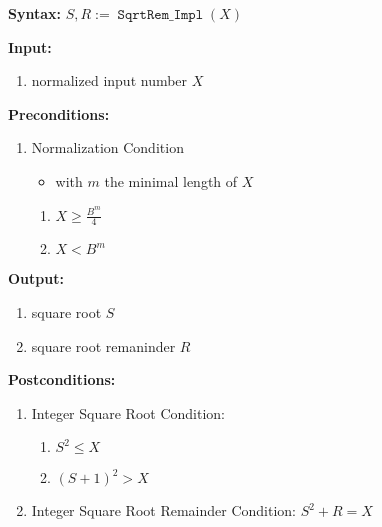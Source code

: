 \documentclass[%
    a4paper,%
]{article}
\makeatletter
\DeclareMathOperator\SqrtRemImpl{\texttt{SqrtRem\_Impl}}
\newenvironment*{algo}{%
    \newcommand*\algo@noNextParskip{%
        \vspace{-\parskip}%
    }%
    \newcommand*\algo@section{\textbf}%
    \newcommand*\Syntax{%
        \algo@section{Syntax:} %
    }%
    \newcommand*\Input{%
        \algo@section{Input:}%
        \algo@noNextParskip%
    }%
    \newcommand*\PreConditions{%
        \algo@section{Preconditions:}%
        \algo@noNextParskip%
    }%
    \newcommand*\Output{%
        \algo@section{Output:}%
        \algo@noNextParskip%
    }%
    \newcommand*\PostConditions{%
        \algo@section{Postconditions:}%
        \algo@noNextParskip%
    }%
    \newcommand*\DeducedPostConditions{%
        \algo@section{Deduced Postconditions:}%
        \algo@noNextParskip%
    }%
    \newcommand*\Algorithm{%
        \algo@section{Algorithm:}%
        \algo@noNextParskip%
    }%
}{%
}
\makeatother
\begin{document}
\begin{algo}
\Syntax $S, R := \SqrtRemImpl(X)$

\Input
\begin{enumerate}
\item normalized input number $X$
\end{enumerate}

\PreConditions
\begin{enumerate}
\item Normalization Condition
    \begin{itemize}
    \item with $m$ the minimal length of $X$
    \end{itemize}
    \begin{enumerate}
    \item $X \ge \frac{B^m}{4}$
    \item $X < B^m$
    \end{enumerate}
\end{enumerate}

\Output
\begin{enumerate}
\item square root $S$
\item square root remaninder $R$
\end{enumerate}

\PostConditions
\begin{enumerate}
\item Integer Square Root Condition:
    \begin{enumerate}
    \item $S^2 \le X$
    \item $(S+1)^2 > X$
    \end{enumerate}
\item Integer Square Root Remainder Condition: $S^2 + R = X$
\end{enumerate}


\end{algo}
\end{document}
